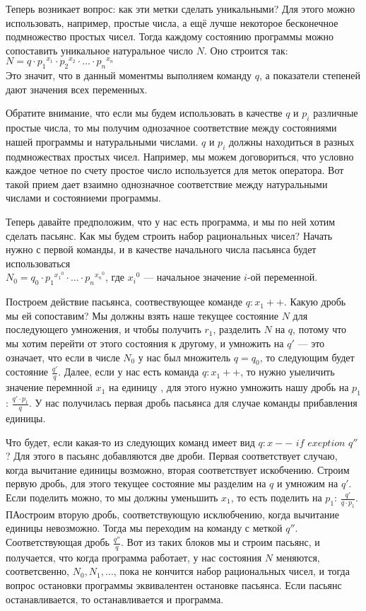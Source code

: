 \documentclass[russian]{lecture-notes}
\begin{document}
	Теперь возникает вопрос: как эти метки сделать уникальными? Для этого можно использовать, например, простые числа, а ещё лучше некоторое бесконечное подмножество простых чисел. Тогда каждому состоянию программы можно сопоставить уникальное натуральное число $N$. Оно строится так: \\ $N = q \cdot {p_1}^{x_1} \cdot {p_2}^{x_2} \cdot \ldots \cdot {p_n}^{x_n}$
	\\ Это значит, что в данный моментмы выполняем команду $q$, а показатели степеней дают значения всех переменных.
	
	Обратите внимание, что если мы будем использовать в качестве $q$ и $p_i$ различные простые числа, то мы получим однозачное соответствие между состояниями нашей программы и натуральными числами. $q$ и $p_i$ должны находиться в разных подмножествах простых чисел. Например, мы можем договориться, что условно каждое четное по счету простое число используется для меток оператора. Вот такой прием дает взаимно однозначное соответствие между натуральными числами и состояниеми программы.
	
	Теперь давайте предположим, что у нас есть программа, и мы по ней хотим сделать пасьянс. Как мы будем строить набор рациональных чисел? Начать нужно с первой команды, и в качестве начального числа пасьянса будет использоваться \\
	$N_0 = q_0 \cdot {p_1}^{{x_1}^0} \cdot \ldots \cdot {p_n}^{{x_n}^0}$, где ${x_i}^0$ --- начальное значение $i$-ой переменной. 
	
	Построем действие пасьянса, соотвествующее команде $q: x_1 + +$. Какую дробь мы ей сопоставим? Мы должны взять наше текущее состояние $N$ для последующего умножения, и чтобы получить $r_1$, разделить  $N$  на $q$, потому что мы хотим перейти от этого состояния к другому, и умножить на $q'$ --- это означает, что если в числе $N_0$ у нас был множитель $q = q_0$, то следующим будет состояние $\frac{q'}{q}$. Далее, если у нас есть команда $q: x_1 + +$, то нужно уыеличить значение перемнной $x_1$ на единицу , для этого нужно умножить нашу дробь на $p_1$: $\frac{q' \cdot {p_1}}{q}$. У нас получилась первая дробь пасьянса для случае команды прибавления единицы.
	
	Что будет, если какая-то из следующих команд имеет вид $q: x - -$ $if$ $exeption$ $q''$? Для этого в пасьянс добавляются две дроби. Первая соответствует случаю, когда вычитание единицы возможно, вторая соответствует искобчению. Строим первую дробь, для этого текущее состояние мы разделим на $q$ и умножим на $q'$. Если поделить можно, то мы должны уменьшить $x_1$, то есть поделить на $p_1$: $\frac{q'}{q \cdot {p_1}}$. ПАостроим вторую дробь, соответствующую исклюбчению, когда вычитание единицы невозможно. Тогда мы переходим на команду с меткой $q''$. Соответствующая дробь $\frac{q''}{q}$. Вот из таких блоков мы и строим пасьянс, и получается, что когда программа работает, у нас состояния $N$ меняются, соответсвенно, $N_0, N_1, \ldots$, пока не кончится набор рациональных чисел, и тогда вопрос остановки программы эквивалентен остановке пасьянса. Если пасьянс останавливается, то останавливается и программа.
	
\end{document}
